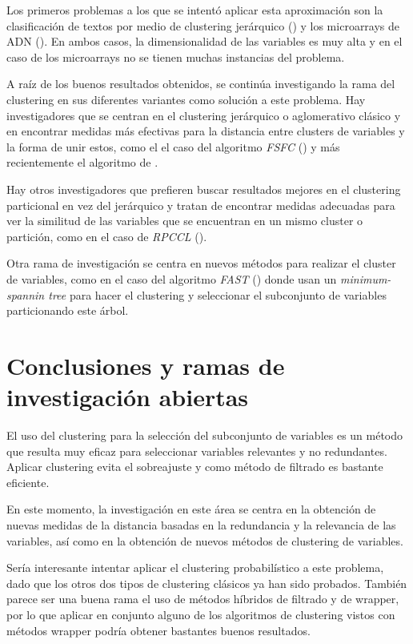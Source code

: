 \documentclass[a4paper,11pt]{article}
\begin{document}
Los primeros problemas a los que se intentó aplicar esta aproximación son la clasificación de textos por medio de clustering jerárquico (\cite{dhillon2003}) y los microarrays de ADN (\cite{yu2004}). En ambos casos, la dimensionalidad de las variables es muy alta y en el caso de los microarrays no se tienen muchas instancias del problema.

A raíz de los buenos resultados obtenidos, se continúa investigando la rama del clustering en sus diferentes variantes como solución a este problema. Hay investigadores que se centran en el clustering jerárquico o aglomerativo clásico y en encontrar medidas más efectivas para la distancia entre clusters de variables y la forma de unir estos, como el el caso del algoritmo \textit{FSFC} (\cite{hliu2011}) y más recientemente el algoritmo de \cite{dehghan2016}.

Hay otros investigadores que prefieren buscar resultados mejores en el clustering particional en vez del jerárquico y tratan de encontrar medidas adecuadas para ver la similitud de las variables que se encuentran en un mismo cluster o partición, como en el caso de \textit{RPCCL} (\cite{yiu2012}).

Otra rama de investigación se centra en nuevos métodos para realizar el cluster de variables, como en el caso del algoritmo \textit{FAST} (\cite{fast}) donde usan un \textit{minimum-spannin tree} para hacer el clustering y seleccionar el subconjunto de variables particionando este árbol.

\section{Conclusiones y ramas de investigación abiertas}

El uso del clustering para la selección del subconjunto de variables es un método que resulta muy eficaz para seleccionar variables relevantes y no redundantes. Aplicar clustering evita el sobreajuste y como método de filtrado es bastante eficiente.

En este momento, la investigación en este área se centra en la obtención de nuevas medidas de la distancia basadas en la redundancia y la relevancia de las variables, así como en la obtención de nuevos métodos de clustering de variables.

Sería interesante intentar aplicar el clustering probabilístico a este problema, dado que los otros dos tipos de clustering clásicos ya han sido probados. También parece ser una buena rama el uso de métodos híbridos de filtrado y de wrapper, por lo que aplicar en conjunto alguno de los algoritmos de clustering vistos con métodos wrapper podría obtener bastantes buenos resultados.
\end{document}
